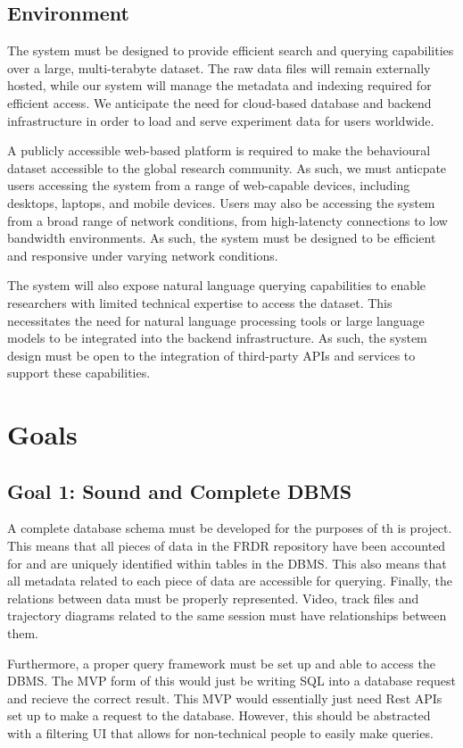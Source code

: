 \documentclass{article}
\begin{document}
\subsection{Environment}


\par{
  The system must be designed to provide efficient search and querying capabilities over a large, multi-terabyte dataset. The raw data files will remain externally hosted, while our system will manage the metadata and indexing required for efficient access. We anticipate the need for cloud-based database and backend infrastructure in order to load and serve experiment data for users worldwide.  
}

\par{
  A publicly accessible web-based platform is required to make the behavioural dataset accessible to the global research community. As such, we must anticpate users accessing the system from a range of web-capable devices, including desktops, laptops, and mobile devices. Users may also be accessing the system from a broad range of network conditions, from high-latencty connections to low bandwidth environments. As such, the system must be designed to be efficient and responsive under varying network conditions. 
}

\par{
  The system will also expose natural language querying capabilities to enable researchers with limited technical expertise to access the dataset. This necessitates the need for natural language processing tools or large language models to be integrated into the backend infrastructure. As such, the system design must be open to the integration of third-party APIs and services to support these capabilities.
}

\section{Goals}

  \subsection{Goal 1: Sound and Complete DBMS} 
  
  \par{ A complete database schema must be developed for the purposes
  of th is project. This means that all pieces of data in the FRDR repository have
  been accounted for and are uniquely identified within tables in the DBMS. This also means that
  all metadata related to each piece of data are accessible for querying. Finally,
  the relations between data must be properly represented. Video, track files and trajectory diagrams
  related to the same session must have relationships between them.
  
  Furthermore, a proper query framework must be set up and able to access the DBMS. 
  The MVP form of this would just be writing SQL into a database request and
  recieve the correct result. This MVP would essentially just need Rest APIs set up
  to make a request to the database. However, this should be abstracted with a filtering UI that
  allows for non-technical people to easily make queries.}
\end{document}
